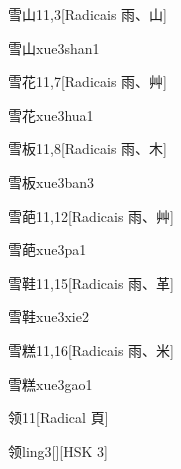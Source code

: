 \begin{entry}{雪山}{11,3}[Radicais ⾬、⼭]
  \begin{phonetics}{雪山}{xue3shan1}
  \end{phonetics}
\end{entry}

\begin{entry}{雪花}{11,7}[Radicais ⾬、⾋]
  \begin{phonetics}{雪花}{xue3hua1}
  \end{phonetics}
\end{entry}

\begin{entry}{雪板}{11,8}[Radicais ⾬、⽊]
  \begin{phonetics}{雪板}{xue3ban3}
  \end{phonetics}
\end{entry}

\begin{entry}{雪葩}{11,12}[Radicais ⾬、⾋]
  \begin{phonetics}{雪葩}{xue3pa1}
  \end{phonetics}
\end{entry}

\begin{entry}{雪鞋}{11,15}[Radicais ⾬、⾰]
  \begin{phonetics}{雪鞋}{xue3xie2}
  \end{phonetics}
\end{entry}

\begin{entry}{雪糕}{11,16}[Radicais ⾬、⽶]
  \begin{phonetics}{雪糕}{xue3gao1}
  \end{phonetics}
\end{entry}

\begin{entry}{领}{11}[Radical ⾴]
  \begin{phonetics}{领}{ling3}[][HSK 3]
  \end{phonetics}
\end{entry}

